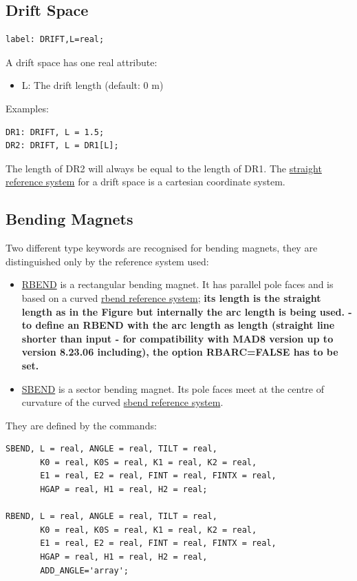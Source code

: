%
\subsection{Drift Space}
\label{sec:drift}

\begin{verbatim}
label: DRIFT,L=real;
\end{verbatim} 

A drift space has one real attribute: 
\begin{itemize}
   \item L: The drift length (default: 0 m) 
\end{itemize} 

Examples: 
\begin{verbatim}
DR1: DRIFT, L = 1.5;
DR2: DRIFT, L = DR1[L];
\end{verbatim} 

The length of DR2 will always be equal to the length of DR1. The
\href{../Introduction/local_system.html#straight}{straight reference
  system} for a drift space is a cartesian coordinate system.  


%
\subsection{Bending Magnets}
\label{sec:bend}
Two different type keywords are recognised for bending magnets, they are
distinguished only by the reference system used:  
\begin{itemize}
   \item \href{rbend}{RBEND} \label{bend_rbend} is a rectangular bending magnet. It has
     parallel pole faces and is based on a curved
     \href{local_system.html#rbend}{rbend reference system};  \textbf{
       its length is the straight length as in the Figure but internally
       the arc length is being used.  - to define an RBEND with the arc
       length as length (straight line shorter than input - for
       compatibility with MAD8 version up to version 8.23.06 including),
       the option RBARC=FALSE has to be set.} 
   \item \href{sbend}{SBEND} is a sector bending magnet. Its pole faces
     meet at the centre of curvature of the curved
     \href{local_system.html#sbend}{sbend reference system}.  
\end{itemize} 

They are defined by the commands: 
\begin{verbatim}
SBEND, L = real, ANGLE = real, TILT = real, 
       K0 = real, K0S = real, K1 = real, K2 = real, 
       E1 = real, E2 = real, FINT = real, FINTX = real, 
       HGAP = real, H1 = real, H2 = real;

RBEND, L = real, ANGLE = real, TILT = real, 
       K0 = real, K0S = real, K1 = real, K2 = real, 
       E1 = real, E2 = real, FINT = real, FINTX = real,
       HGAP = real, H1 = real, H2 = real,
       ADD_ANGLE='array';
\end{verbatim} 

